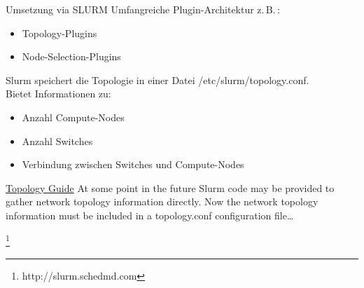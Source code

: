\begin{frame}{Umsetzung via SLURM}
    Umfangreiche Plugin-Architektur z.\,B.\,:
    \begin{itemize}
        \item Topology-Plugins %
        \item Node-Selection-Plugins
    \end{itemize}
    Slurm speichert die Topologie in einer Datei /etc/slurm/topology.conf.\\
    Bietet Informationen zu:
    \begin{itemize}
        \item Anzahl Compute-Nodes
        \item Anzahl Switches
        \item Verbindung zwischen Switches und Compute-Nodes
    \end{itemize}
    \begin{block}{\href{http://slurm.schedmd.com/topology.html}{Topology Guide}}
        At some point in the future Slurm code may be provided to gather network
        topology information directly. Now the network topology information must be
        included in a topology.conf configuration file\ldots
    \end{block}
    \tiny{\footnote{http://slurm.schedmd.com}}
\end{frame}



